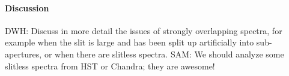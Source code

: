 \documentclass[12pt]{article}
\begin{document}
\paragraph{Discussion}
DWH: Discuss in more detail the issues of strongly overlapping
spectra, for example when the slit is large and has been split up
artificially into sub-apertures, or when there are slitless spectra.
SAM: We should analyze some slitless spectra from HST or Chandra; they
are awesome!
\end{document}
